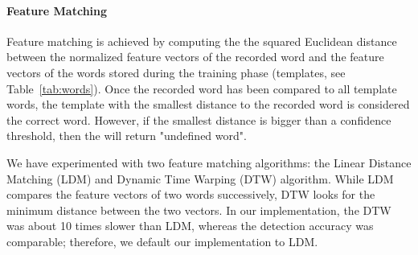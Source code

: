 \paragraph{Feature Matching}
Feature matching is achieved by computing the the squared Euclidean distance between the normalized feature vectors of the recorded word and the feature vectors of the words stored during the training phase (templates, see Table~\ref{tab:words}). 
Once the recorded word has been compared to all template words, the template with the smallest distance to the recorded word is considered the correct word. However, if the smallest distance is bigger than a confidence threshold, then the \cim will return "undefined word". 

We have experimented with two feature matching algorithms: the Linear Distance Matching (LDM) and Dynamic Time Warping (DTW) algorithm. While LDM compares the feature vectors of two words successively, DTW looks for the minimum distance between the two vectors. In our implementation, the DTW was about 10 times slower than LDM, whereas the detection accuracy was comparable; therefore, we default our implementation to LDM.
%
%
